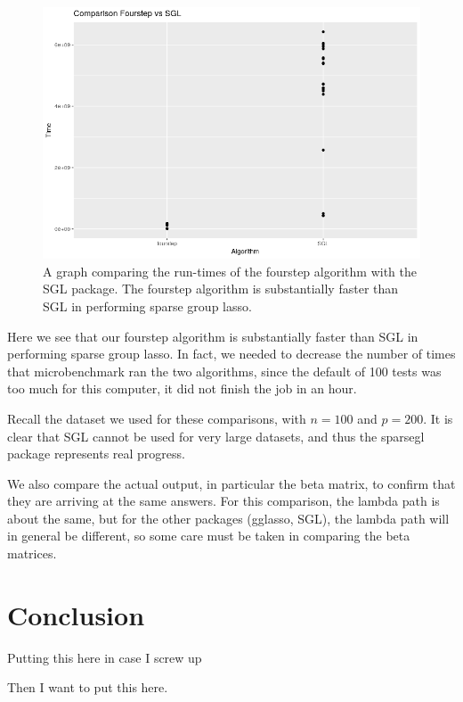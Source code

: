 \documentclass[12pt]{article}
\begin{document}
\begin{figure}[tb!]
\centering
\includegraphics[scale=0.5]{fourvsSGL.png}
\caption{A graph comparing the run-times of the fourstep algorithm with the SGL package. The fourstep algorithm is substantially faster than SGL in performing sparse group lasso.}
\label{fig:fourvsSGL}
\end{figure}


Here we see that our fourstep algorithm is substantially faster than SGL in performing sparse group lasso. In fact, we needed to decrease the number of times that microbenchmark ran the two algorithms, since the default of 100 tests was too much for this computer, it did not finish the job in an hour.

Recall the dataset we used for these comparisons, with $n=100$ and $p=200$. It is clear that SGL cannot be used for very large datasets, and thus the sparsegl package represents real progress.


We also compare the actual output, in particular the beta matrix, to confirm that they are arriving at the same answers. For this comparison, the lambda path is about the same, but for the other packages (gglasso, SGL), the lambda path will in general be different, so some care must be taken in comparing the beta matrices.

\section{Conclusion}


Putting this here in case I screw up \citep{tibshirani2012strong}

Then I want to put this \citep{yang2015fast} here.
\end{document}
